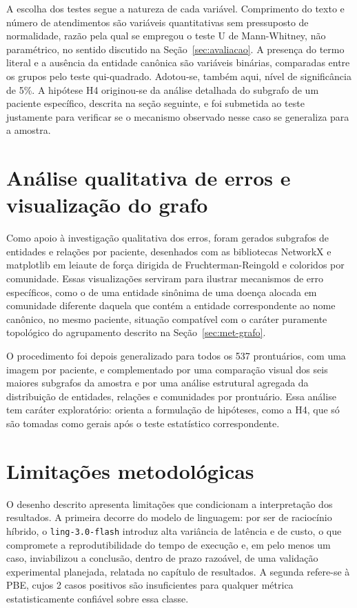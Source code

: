 A escolha dos testes segue a natureza de cada variável. Comprimento do texto e número de atendimentos são variáveis quantitativas sem pressuposto de normalidade, razão pela qual se empregou o teste U de Mann-Whitney, não paramétrico, no sentido discutido na Seção~\ref{sec:avaliacao}. A presença do termo literal e a ausência da entidade canônica são variáveis binárias, comparadas entre os grupos pelo teste qui-quadrado. Adotou-se, também aqui, nível de significância de 5\%. A hipótese H4 originou-se da análise detalhada do subgrafo de um paciente específico, descrita na seção seguinte, e foi submetida ao teste justamente para verificar se o mecanismo observado nesse caso se generaliza para a amostra.

\section{Análise qualitativa de erros e visualização do grafo}\label{sec:met-qualitativa}

Como apoio à investigação qualitativa dos erros, foram gerados subgrafos de entidades e relações por paciente, desenhados com as bibliotecas NetworkX e matplotlib em leiaute de força dirigida de Fruchterman-Reingold e coloridos por comunidade.
Essas visualizações serviram para ilustrar mecanismos de erro específicos, como o de uma entidade sinônima de uma doença alocada em comunidade diferente daquela que contém a entidade correspondente ao nome canônico, no mesmo paciente, situação compatível com o caráter puramente topológico do agrupamento descrito na Seção~\ref{sec:met-grafo}.

O procedimento foi depois generalizado para todos os 537 prontuários, com uma imagem por paciente, e complementado por uma comparação visual dos seis maiores subgrafos da amostra e por uma análise estrutural agregada da distribuição de entidades, relações e comunidades por prontuário. Essa análise tem caráter exploratório: orienta a formulação de hipóteses, como a H4, que só são tomadas como gerais após o teste estatístico correspondente.

\section{Limitações metodológicas}\label{sec:met-limitacoes}

O desenho descrito apresenta limitações que condicionam a interpretação dos resultados. A primeira decorre do modelo de linguagem: por ser de raciocínio híbrido, o \texttt{ling-3.0-flash} introduz alta variância de latência e de custo, o que compromete a reprodutibilidade do tempo de execução e, em pelo menos um caso, inviabilizou a conclusão, dentro de prazo razoável, de uma validação experimental planejada, relatada no capítulo de resultados. A segunda refere-se à PBE, cujos 2 casos positivos são insuficientes para qualquer métrica estatisticamente confiável sobre essa classe.

